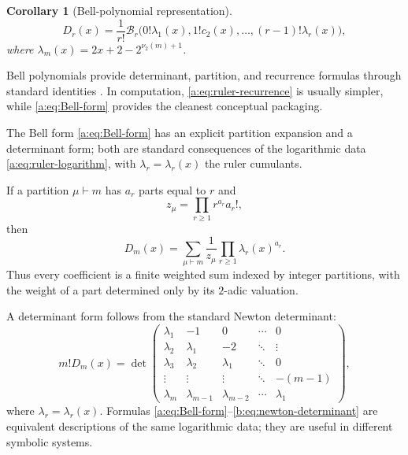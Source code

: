 \documentclass[11pt,a4paper,oneside,openany]{book}
\numberwithin{equation}{chapter}
\newtheorem{corollary}[theorem]{Corollary}
\theoremstyle{definition}
\theoremstyle{remark}
\newcommand{\nuTwo}{\nu_2}
\newcommand{\Diag}{D}
\newcommand{\Bell}{\mathcal B}
\begin{document}
\begin{corollary}[Bell-polynomial representation]
\begin{equation}
 \boxed{
 \Diag_r(x)=\frac1{r!}
 \Bell_r\bigl(0!\lambda_1(x),1!c_2(x),\ldots,(r-1)!\lambda_r(x)\bigr),}
 \label{a:eq:Bell-form}
\end{equation}
where \(\lambda_m(x)=2x+2-2^{\nuTwo(m)+1}\).
\end{corollary}

Bell polynomials provide determinant, partition, and recurrence formulas
through standard identities \cite{comtet}.  In computation,
\eqref{a:eq:ruler-recurrence} is usually simpler, while \eqref{a:eq:Bell-form}
provides the cleanest conceptual packaging.

The Bell form \eqref{a:eq:Bell-form} has an explicit partition expansion and
a determinant form; both are standard consequences of the logarithmic data
\eqref{a:eq:ruler-logarithm}, with $\lambda_r=\lambda_r(x)$ the ruler
cumulants.

If a partition $\mu\vdash m$ has $a_r$ parts equal to $r$ and
\[
 z_\mu=\prod_{r\ge1}r^{a_r}a_r!,
\]
then
\begin{equation}
 \Diag_m(x)=\sum_{\mu\vdash m}
  \frac{1}{z_\mu}\prod_{r\ge1}\lambda_r(x)^{a_r}.
 \label{b:eq:partition-formula}
\end{equation}
Thus every coefficient is a finite weighted sum indexed by integer
partitions, with the weight of a part determined only by its $2$-adic
valuation.

A determinant form follows from the standard Newton determinant:
\begin{equation}
 m!\Diag_m(x)=
 \det\!\begin{pmatrix}
 \lambda_1 & -1 & 0 & \cdots & 0\\
 \lambda_2 & \lambda_1 & -2 & \ddots & \vdots\\
 \lambda_3 & \lambda_2 & \lambda_1 & \ddots & 0\\
 \vdots & \vdots & \vdots & \ddots & -(m-1)\\
 \lambda_m & \lambda_{m-1} & \lambda_{m-2} & \cdots & \lambda_1
 \end{pmatrix},
 \label{b:eq:newton-determinant}
\end{equation}
where $\lambda_r=\lambda_r(x)$.  Formulas
\eqref{a:eq:Bell-form}--\eqref{b:eq:newton-determinant} are equivalent descriptions
of the same logarithmic data; they are useful in different symbolic systems.
\end{document}
